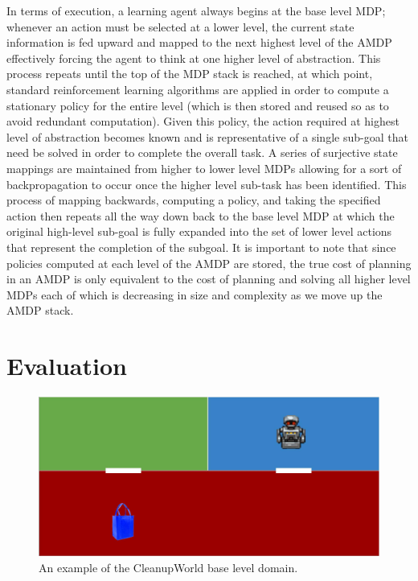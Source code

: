 \documentclass[conference]{IEEEtran}
\begin{document}
In terms of execution, a learning agent always begins at the base level MDP; whenever an action must be selected at a lower level, the current state information is fed upward and mapped to the next highest level of the AMDP effectively forcing the agent to think at one higher level of abstraction. This process repeats until the top of the MDP stack is reached, at which point, standard reinforcement learning algorithms are applied in order to compute a stationary policy for the entire level (which is then stored and reused so as to avoid redundant computation). Given this policy, the action required at highest level of abstraction becomes known and is representative of a single sub-goal that need be solved in order to complete the overall task. A series of surjective state mappings are maintained from higher to lower level MDPs allowing for a sort of backpropagation to occur once the higher level sub-task has been identified. This process of mapping backwards, computing a policy, and taking the specified action then repeats all the way down back to the base level MDP at which the original high-level sub-goal is fully expanded into the set of lower level actions that represent the completion of the subgoal. It is important to note that since policies computed at each level of the AMDP are stored, the true cost of planning in an AMDP is only equivalent to the cost of planning and solving all higher level MDPs each of which is decreasing in size and complexity as we move up the AMDP stack.

\section{Evaluation}

\begin{figure}[tbp]
\begin{center}
\includegraphics[scale=0.12]{images/cleanup}
\caption{\small An example of the CleanupWorld base level domain.
}
\end{center}
\end{figure}
\end{document}
